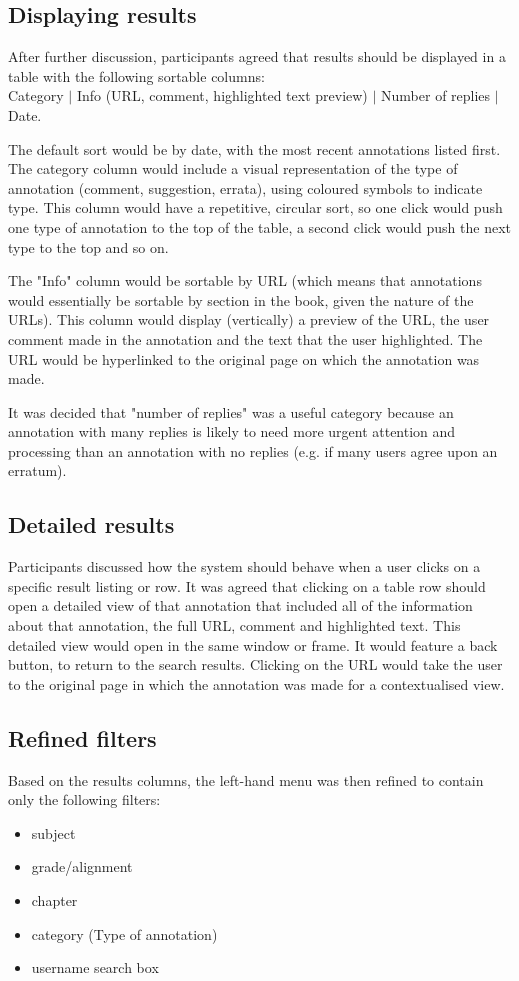 \subsection{Displaying results}
After further discussion, participants agreed that results should be displayed in a table with the following sortable columns:\\ 
Category $\vert$ Info (URL, comment, highlighted text preview) $\vert$ Number of replies $\vert$ Date.

The default sort would be by date, with the most recent annotations listed first. The category column would include a visual representation of the type of annotation (comment, suggestion, errata), using coloured symbols to indicate type. This column would have a repetitive, circular sort, so one click would push one type of annotation to the top of the table, a second click would push the next type to the top and so on. 

The "Info" column would be sortable by URL (which means that annotations would essentially be sortable by section in the book, given the nature of the URLs). This column would display (vertically) a preview of the URL, the user comment made in the annotation and the text that the user highlighted. The URL would be hyperlinked to the original page on which the annotation was made. 

It was decided that "number of replies" was a useful category because an annotation with many replies is likely to need more urgent attention and processing than an annotation with no replies (e.g. if many users agree upon an erratum).

\subsection{Detailed results}
Participants discussed how the system should behave when a user clicks on a specific result listing or row. It was agreed that clicking on a table row should open a detailed view of that annotation that included all of the information about that annotation, the full URL, comment and highlighted text. This detailed view would open in the same window or frame. It would feature a back button, to return to the search results. Clicking on the URL would take the user to the original page in which the annotation was made for a contextualised view. 

\subsection{Refined filters}
Based on the results columns, the left-hand menu was then refined to contain only the following filters:
\begin{itemize}
\item subject
\item grade/alignment
\item chapter
\item category (Type of annotation)
\item username search box 
\end{itemize}

